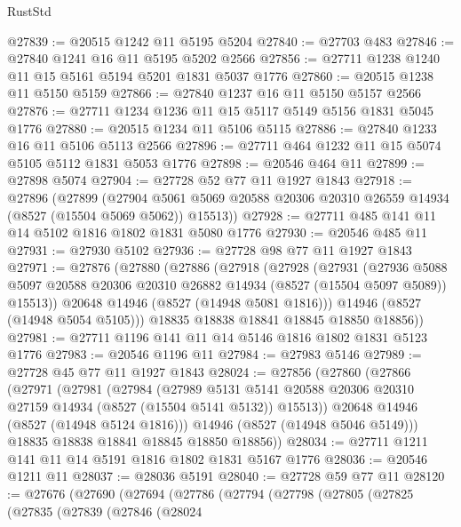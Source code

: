 \begin{lexlean}{RustStd}
\begin{coremodule}
@27839 := @20515 @1242 @11 @5195 @5204
@27840 := @27703 @483
@27846 := @27840 @1241 @16 @11 @5195 @5202 @2566
@27856 := @27711 @1238 @1240 @11 @15 @5161 @5194 @5201 @1831 @5037 @1776
@27860 := @20515 @1238 @11 @5150 @5159
@27866 := @27840 @1237 @16 @11 @5150 @5157 @2566
@27876 := @27711 @1234 @1236 @11 @15 @5117 @5149 @5156 @1831 @5045 @1776
@27880 := @20515 @1234 @11 @5106 @5115
@27886 := @27840 @1233 @16 @11 @5106 @5113 @2566
@27896 := @27711 @464 @1232 @11 @15 @5074 @5105 @5112 @1831 @5053 @1776
@27898 := @20546 @464 @11
@27899 := @27898 @5074
@27904 := @27728 @52 @77 @11 @1927 @1843
@27918 := @27896
    (@27899
      (@27904 @5061 @5069 @20588 @20306 @20310 @26559 @14934 (@8527 (@15504 @5069 @5062)) @15513))
@27928 := @27711 @485 @141 @11 @14 @5102 @1816 @1802 @1831 @5080 @1776
@27930 := @20546 @485 @11
@27931 := @27930 @5102
@27936 := @27728 @98 @77 @11 @1927 @1843
@27971 := @27876
    (@27880
      (@27886
        (@27918
          (@27928
            (@27931
              (@27936
                @5088
                @5097
                @20588
                @20306
                @20310
                @26882
                @14934
                (@8527 (@15504 @5097 @5089))
                @15513))
            @20648
            @14946
            (@8527 (@14948 @5081 @1816)))
          @14946
          (@8527 (@14948 @5054 @5105)))
        @18835
        @18838
        @18841
        @18845
        @18850
        @18856))
@27981 := @27711 @1196 @141 @11 @14 @5146 @1816 @1802 @1831 @5123 @1776
@27983 := @20546 @1196 @11
@27984 := @27983 @5146
@27989 := @27728 @45 @77 @11 @1927 @1843
@28024 := @27856
    (@27860
      (@27866
        (@27971
          (@27981
            (@27984
              (@27989
                @5131
                @5141
                @20588
                @20306
                @20310
                @27159
                @14934
                (@8527 (@15504 @5141 @5132))
                @15513))
            @20648
            @14946
            (@8527 (@14948 @5124 @1816)))
          @14946
          (@8527 (@14948 @5046 @5149)))
        @18835
        @18838
        @18841
        @18845
        @18850
        @18856))
@28034 := @27711 @1211 @141 @11 @14 @5191 @1816 @1802 @1831 @5167 @1776
@28036 := @20546 @1211 @11
@28037 := @28036 @5191
@28040 := @27728 @59 @77 @11
@28120 := @27676
    (@27690
      (@27694
        (@27786
          (@27794
            (@27798
              (@27805
                (@27825
                  (@27835
                    (@27839
                      (@27846
                        (@28024

\end{coremodule}
\end{lexlean}
